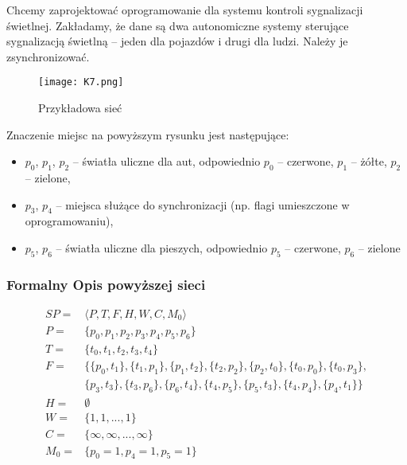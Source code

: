 Chcemy zaprojektować oprogramowanie dla systemu kontroli sygnalizacji świetlnej. Zakładamy, że dane są dwa autonomiczne systemy sterujące sygnalizacją świetlną – jeden dla pojazdów i drugi dla ludzi. Należy je zsynchronizować.

\begin{figure}[H]
	\centering
	\texttt{[image: K7.png]}
	\caption{Przykładowa sieć}
\end{figure}

Znaczenie miejsc na powyższym rysunku jest następujące:

\begin{itemize}
	\item \textbf{$p_0$}, \textbf{$p_1$}, \textbf{$p_2$} – światła uliczne dla aut, odpowiednio $p_0$ – czerwone, $p_1$ – żółte, $p_2$ – zielone,
	\item \textbf{$p_3$}, \textbf{$p_4$} – miejsca służące do synchronizacji (np. flagi umieszczone w oprogramowaniu),
	\item \textbf{$p_5$}, \textbf{$p_6$} – światła uliczne dla pieszych, odpowiednio $p_5$ – czerwone, $p_6$ – zielone
\end{itemize}

\subsubsection{Formalny Opis powyższej sieci}

\begin{align*}
SP = &\langle P, T, F, H, W, C, M_0\rangle \\
P = &\{p_0, p_1, p_2, p_3, p_4, p_5, p_6\} \\
T = &\{t_0, t_1, t_2, t_3, t_4 \} \\
F =  &\big\{ 
\{p_0, t_1\}, \{t_1, p_1\}, \{p_1, t_2\}, \{t_2, p_2\},\{p_2, t_0\}, \{t_0, p_0\},  \{t_0, p_3\}, \\
&\{p_3, t_3\}, \{t_3, p_6\}, \{p_6, t_4\}, \{t_4, p_5\}, \{p_5, t_3\}, \{t_4, p_4\}, \{p_4, t_1\}         \big\} \\
H =  &\emptyset \\
W = &\big\{ 1, 1, ... , 1\big\} \\
C = &\big\{ \infty, \infty, ... , \infty \big\} \\
M_0 = &\big\{ p_0 = 1, p_4 = 1, p_5 = 1 \big\}
\end{align*}

